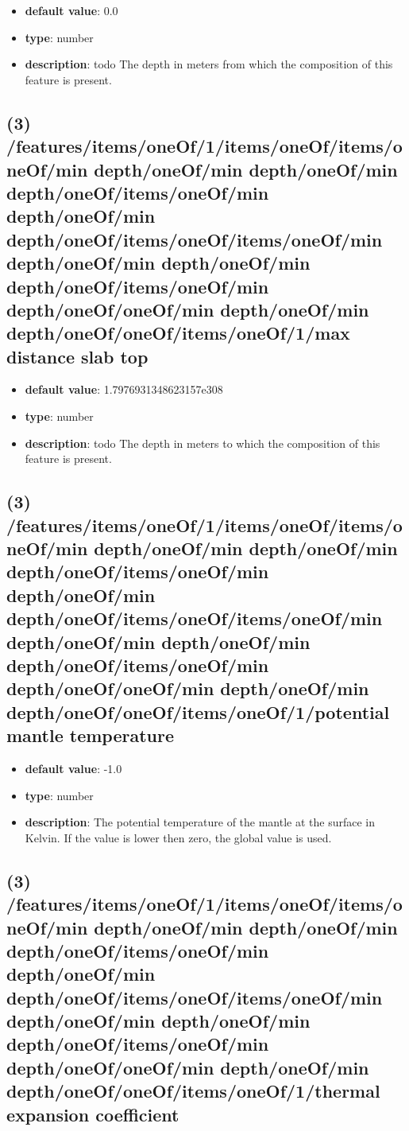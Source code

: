 \begin{itemize}[leftmargin=3em]\item {\bf default value}: 0.0
\item {\bf type}: number
\item {\bf description}: todo The depth in meters from which the composition of this feature is present.
\end{itemize}\subsection{(3) /features/items/oneOf/1/items/oneOf/items/oneOf/min depth/oneOf/min depth/oneOf/min depth/oneOf/items/oneOf/min depth/oneOf/min depth/oneOf/items/oneOf/items/oneOf/min depth/oneOf/min depth/oneOf/min depth/oneOf/items/oneOf/min depth/oneOf/oneOf/min depth/oneOf/min depth/oneOf/oneOf/items/oneOf/1/max distance slab top}
\begin{itemize}[leftmargin=3em]\item {\bf default value}: 1.7976931348623157e308
\item {\bf type}: number
\item {\bf description}: todo The depth in meters to which the composition of this feature is present.
\end{itemize}\subsection{(3) /features/items/oneOf/1/items/oneOf/items/oneOf/min depth/oneOf/min depth/oneOf/min depth/oneOf/items/oneOf/min depth/oneOf/min depth/oneOf/items/oneOf/items/oneOf/min depth/oneOf/min depth/oneOf/min depth/oneOf/items/oneOf/min depth/oneOf/oneOf/min depth/oneOf/min depth/oneOf/oneOf/items/oneOf/1/potential mantle temperature}
\begin{itemize}[leftmargin=3em]\item {\bf default value}: -1.0
\item {\bf type}: number
\item {\bf description}: The potential temperature of the mantle at the surface in Kelvin. If the value is lower then zero, the global value is used.
\end{itemize}\subsection{(3) /features/items/oneOf/1/items/oneOf/items/oneOf/min depth/oneOf/min depth/oneOf/min depth/oneOf/items/oneOf/min depth/oneOf/min depth/oneOf/items/oneOf/items/oneOf/min depth/oneOf/min depth/oneOf/min depth/oneOf/items/oneOf/min depth/oneOf/oneOf/min depth/oneOf/min depth/oneOf/oneOf/items/oneOf/1/thermal expansion coefficient}
